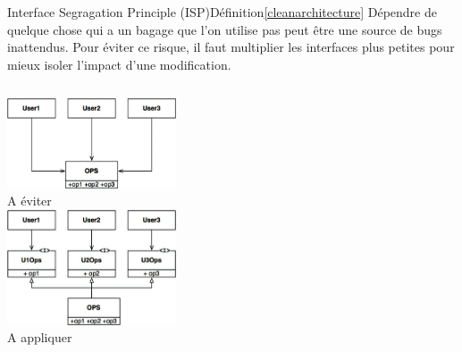 \documentclass{beamer}
\begin{document}
    \begin{frame}{Interface Segragation Principle (ISP)}{Définition\cref{cleanarchitecture}}
        Dépendre de quelque chose qui a un bagage que l'on utilise pas peut être une source de bugs inattendus.
        \bigbreak
        Pour éviter ce risque, il faut multiplier les interfaces plus petites pour mieux isoler l'impact d'une modification.
        \begin{columns}
            \centering
            \includegraphics[width=5cm]{image/i-to-avoid} \\ A éviter \\
            \centering
            \includegraphics[width=5cm]{image/i-preferred} \\ A appliquer \\
        \end{columns}
    \end{frame}
\end{document}
